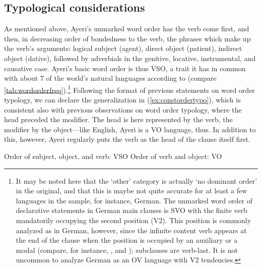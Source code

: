\subsection{Typological considerations}
\label{sec:verbtypo}

As mentioned above, Ayeri's unmarked word order has the verb come first, and
then, in decreasing order of bondedness to the verb, the phrases which make up
the verb's arguments: logical subject (agent), direct object (patient),
indirect object (dative), followed by adverbials in the genitive, locative,
instrumental, and causative case. Ayeri's basic word order is thus VSO, a trait
it has in common with about 7\pct{} of the world's natural languages according
to \citet{wals81} (compare \autoref{tab:wordorderfreq}).\footnote{It may be
noted here that the `other' category is actually `no dominant order' in the
original, and that this is maybe not quite accurate for at least a few
languages in the sample, for instance, German. The unmarked word order of
declarative statements in German main clauses is SVO with the finite verb
mandatorily occupying the second position (V2). This position is commonly
analyzed as  in German, however, since the infinite content verb
 appears at the end of the clause when the  position is
occupied by an auxiliary or a modal (compare, for instance, \cite[375--379,
447--450]{bresnan2016}, and \cite{fortmann2006}); subclauses are verb-last. It
is not uncommon to analyze German as an OV language with V2 tendencies.}
Following the format of previous statements on word order typology, we can
declare the generalization in (\ref{ex:constordertypo}), which is consistent
also with previous observations on word order typology, where the head preceded
the modifier. The head is here represented by the verb, the modifier by the
object---like English, Ayeri is a VO language, thus. In addition to this,
however, Ayeri regularly puts the verb as the head of the clause itself first.

\pex\label{ex:constordertypo}
\a Order of subject, object, and verb: VSO
\a Order of verb and object: VO
\xe


